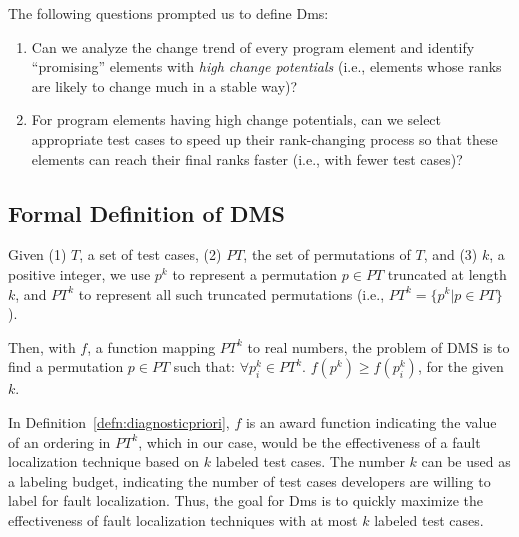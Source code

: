 The following questions prompted us to define {\sc Dms}:

\begin{enumerate}
\item Can we analyze the change trend of every program element and identify ``promising'' elements with {\em high change potentials} (i.e., elements whose ranks are likely to change much in a stable way)?
\item For program elements having high change potentials, can we select appropriate test cases to speed up their rank-changing process so that these elements can reach their final ranks faster (i.e., with fewer test cases)?
\end{enumerate}

\subsection{Formal Definition of DMS}

\begin{definition}
Given (1) $T$, a set of test cases, (2) $PT$, the set of permutations of $T$, and (3) $k$, a positive integer, we use $p^k$ to represent a permutation $p\in PT$ truncated at length $k$, and $PT^k$ to represent all such truncated permutations (i.e., $PT^k=\{p^k|p\in PT\}$).

Then, with $f$, a function mapping $PT^k$ to real numbers, the problem of DMS is to find a permutation $p \in PT$ such that:
	$\forall{p_i^{k} \in PT^{k}}.$	$f(p^{k}) \geq f(p_i^{k})$, for the given $k$.
\label{defn:diagnosticpriori}
\end{definition}

In Definition~\ref{defn:diagnosticpriori}, $f$ is an award function indicating the value of an ordering in $PT^{k}$, which in our case, would be the effectiveness of a fault localization technique based on $k$ labeled test cases.
The number $k$ can be used as a labeling budget, indicating the number of test cases developers are willing to label for fault localization.
Thus, the goal for {\sc Dms} is to quickly maximize the effectiveness of fault localization techniques with at most $k$ labeled test cases.
